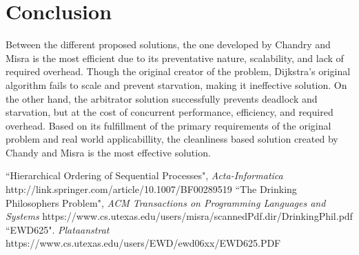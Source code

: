 \documentclass{article}
\begin{document}
\section{Conclusion} Between the different proposed solutions, the one developed by Chandry and Misra is the most efficient due to its preventative nature, scalability, and lack of required overhead. Though the original creator of the problem, Dijkstra's original algorithm fails to scale and prevent starvation, making it ineffective solution. On the other hand, the arbitrator solution successfully prevents deadlock and starvation, but at the cost of concurrent performance, efficiency, and required overhead. Based on its fulfillment of the primary requirements of the original problem and real world applicabillity, the cleanliness based solution created by Chandy and Misra is the most effective solution.

\begin{thebibliography}{100}

 ``Hierarchical Ordering of Sequential Processes", \emph{Acta-Informatica} http://link.springer.com/article/10.1007/BF00289519
 ``The Drinking Philosophers Problem", \emph{ACM Transactions on Programming Languages and Systems} https://www.cs.utexas.edu/users/misra/scannedPdf.dir/DrinkingPhil.pdf
 ``EWD625". \emph{Plataanstrat} https://www.cs.utexas.edu/users/EWD/ewd06xx/EWD625.PDF


\end{thebibliography}
\end{document}
